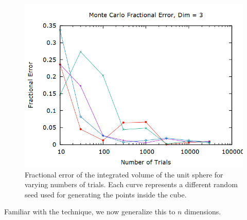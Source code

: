 \documentclass[aps,prl,twocolumn,superscriptaddress]{revtex4-1}
\begin{document}
\begin{figure}[htbp]
  	\begin{center}
 		\includegraphics[scale=0.3]{pond2err.png}
  		\caption{Fractional error of the integrated volume of the unit sphere for varying numbers of trials. Each curve represents a different random seed used for generating the points inside the cube.}
  		\label{gr:3derr}
 	\end{center}
\end{figure}

Familiar with the technique, we now generalize this to $n$ dimensions.
\end{document}
